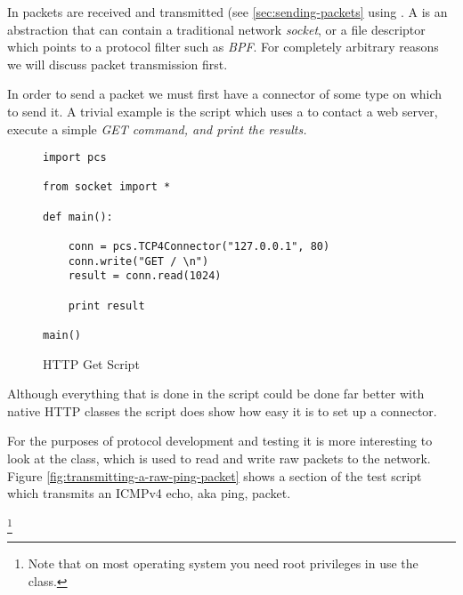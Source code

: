 \documentclass[11pt]{article}
\begin{document}
In  packets are received and transmitted (see
\ref{sec:sending-packets} using .  A
 is an abstraction that can contain a traditional
network \emph{socket}, or a file descriptor which points to a protocol
filter such as \emph{BPF}.  For completely arbitrary reasons we will
discuss packet transmission first.

In order to send a packet we must first have a connector of some type
on which to send it.  A trivial example is the 
script which uses a  to contact a web server,
execute a simple \em{GET} command, and print the results.

\begin{figure}
  \centering
\begin{verbatim}
import pcs

from socket import *

def main():

    conn = pcs.TCP4Connector("127.0.0.1", 80)
    conn.write("GET / \n")
    result = conn.read(1024)

    print result

main()
\end{verbatim}
  \caption{HTTP Get Script}
  \label{fig:http-get-script}
\end{figure}

Although everything that is done in the  script
could be done far better with  native HTTP classes
the script does show how easy it is to set up a connector.

For the purposes of protocol development and testing it is more
interesting to look at the  class, which is used
to read and write raw packets to the network.  Figure
\ref{fig:transmitting-a-raw-ping-packet} shows a section of the
 test script which transmits an ICMPv4 echo, aka
ping, packet.  

\footnote{Note that on most operating system you need root privileges
  in use the  class.}
\end{document}
